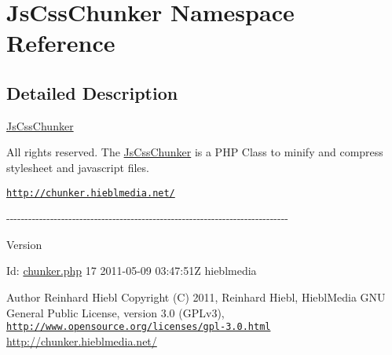 \hypertarget{namespace_js_css_chunker}{
\section{JsCssChunker Namespace Reference}
\label{namespace_js_css_chunker}
}


\subsection{Detailed Description}
\hyperlink{class_js_css_chunker}{JsCssChunker}

All rights reserved. The \hyperlink{class_js_css_chunker}{JsCssChunker} is a PHP Class to minify and compress stylesheet and javascript files.
\begin{DoxyItemize}
\item \href{http://chunker.hieblmedia.net/}{\tt http://chunker.hieblmedia.net/}
\end{DoxyItemize}

-\/-\/-\/-\/-\/-\/-\/-\/-\/-\/-\/-\/-\/-\/-\/-\/-\/-\/-\/-\/-\/-\/-\/-\/-\/-\/-\/-\/-\/-\/-\/-\/-\/-\/-\/-\/-\/-\/-\/-\/-\/-\/-\/-\/-\/-\/-\/-\/-\/-\/-\/-\/-\/-\/-\/-\/-\/-\/-\/-\/-\/-\/-\/-\/-\/-\/-\/-\/-\/-\/-\/-\/-\/-\/-\/-\/-\/

\begin{DoxyVersion}{Version}

\end{DoxyVersion}
\begin{DoxyParagraph}{Id:}
\hyperlink{chunker_8php_source}{chunker.php} 17 2011-\/05-\/09 03:47:51Z hieblmedia 
\end{DoxyParagraph}


\begin{DoxyAuthor}{Author}
Reinhard Hiebl  Copyright (C) 2011, Reinhard Hiebl, HieblMedia  GNU General Public License, version 3.0 (GPLv3), \href{http://www.opensource.org/licenses/gpl-3.0.html}{\tt http://www.opensource.org/licenses/gpl-\/3.0.html} \hyperlink{}{http://chunker.hieblmedia.net/}
\end{DoxyAuthor}
